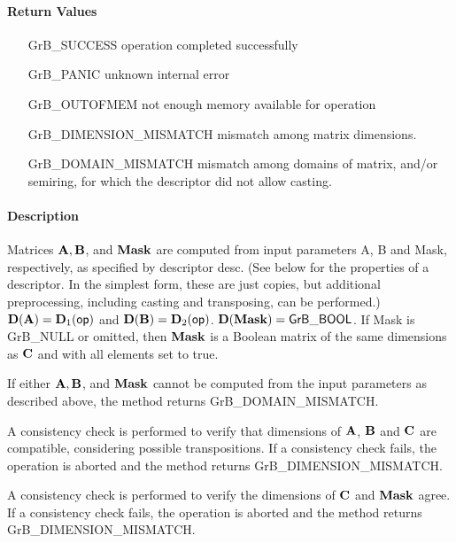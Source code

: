 \paragraph{Return Values}

\begin{itemize}[leftmargin=2.1in]
\item[{\sf GrB\_SUCCESS}]             operation completed successfully
\item[{\sf GrB\_PANIC}]               unknown internal error
\item[{\sf GrB\_OUTOFMEM}]            not enough memory available for operation
\item[{\sf GrB\_DIMENSION\_MISMATCH}] mismatch among matrix dimensions.
\item[{\sf GrB\_DOMAIN\_MISMATCH}]    mismatch among domains of matrix, and/or semiring, for which the descriptor did not allow casting.
\end{itemize}


\paragraph{Description}

Matrices ${\bf A}, {\bf B}$, and ${\bf Mask}$ are computed from
input parameters {\sf A}, {\sf B} and {\sf Mask}, respectively, as specified
by descriptor {\sf desc}. (See below for the properties of a descriptor. In
the simplest form, these are just copies, but additional preprocessing,
including casting and transposing, can be performed.)  $\bold{D}({\bf A}) =
\bold{D}_1({\sf op})$ and $\bold{D}({\bf B}) = \bold{D}_2({\sf op})$.
$\bold{D}({\bf Mask}) = {\sf GrB\_BOOL}$.  If {\sf Mask} is {\sf GrB\_NULL} or omitted,
then ${\bf Mask}$ is a Boolean matrix of the same dimensions as ${\bf C}$
and with all elements set to {\sf true}.

If either ${\bf A}, {\bf B}$, and ${\bf Mask}$  cannot be computed
from the input parameters as described above, the method returns {\sf
GrB\_DOMAIN\_MISMATCH}.

A consistency check is performed to verify that dimensions of ${\bf A}$, ${\bf B}$
and ${\bf C}$ are compatible, considering possible transpositions.  If a consistency check fails, the operation is
aborted and the method returns {\sf GrB\_DIMENSION\_MISMATCH}.

A consistency check is performed to verify the dimensions of ${\bf C}$
and ${\bf Mask}$ agree.  If a consistency check fails, the operation is
aborted and the method returns {\sf GrB\_DIMENSION\_MISMATCH}.

